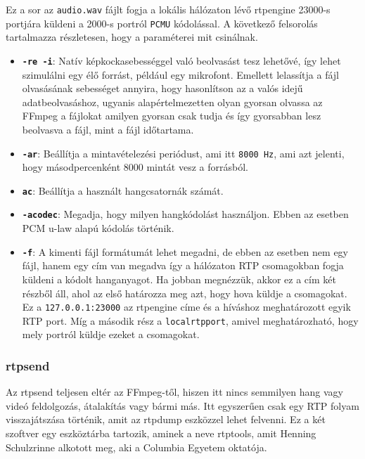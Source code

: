 Ez a sor az \texttt{audio.wav} fájlt fogja a lokális hálózaton lévő rtpengine 23000-s
portjára küldeni a 2000-s portról \texttt{PCMU} kódolással. A következő felsorolás 
tartalmazza részletesen, hogy a paraméterei mit csinálnak.

\begin{itemize}
	\item \textbf{\texttt{-re -i}}: Natív képkockasebességgel való beolvasást tesz 
	lehetővé, így lehet szimulálni egy élő forrást, például egy mikrofont. Emellett 
	lelassítja a fájl olvasásának sebességet annyira, hogy hasonlítson az a valós idejű 
	adatbeolvasáshoz, ugyanis alapértelmezetten olyan gyorsan olvassa az FFmpeg a 
	fájlokat amilyen gyorsan csak tudja és így gyorsabban lesz beolvasva a fájl, mint a 
	fájl időtartama. 
	\item \textbf{\texttt{-ar}}: Beállítja a mintavételezési periódust, ami itt 
	\texttt{8000 Hz}, ami azt jelenti, hogy másodpercenként 8000 mintát vesz a forrásból. 
	\item \textbf{\texttt{ac}}: Beállítja a használt hangcsatornák számát.
	\item \textbf{\texttt{-acodec}}: Megadja, hogy milyen hangkódolást használjon. Ebben 
	az esetben PCM u-law alapú kódolás történik.
	\item \textbf{\texttt{-f}}: A kimenti fájl formátumát lehet megadni, de ebben az 
	esetben nem egy fájl, hanem egy cím van megadva így a hálózaton RTP csomagokban fogja 
	küldeni a kódolt hanganyagot. Ha jobban megnézzük, akkor ez a cím két részből áll,
	ahol az első határozza meg azt, hogy hova küldje a csomagokat. Ez a 
	\texttt{127.0.0.1:23000} az rtpengine címe és a híváshoz meghatározott egyik RTP
	port. Míg a második rész a \texttt{localrtpport}, amivel meghatározható, hogy mely 
	portról küldje ezeket a csomagokat.
\end{itemize}

\subsubsection{rtpsend}

Az rtpsend \cite{rtpsend} teljesen eltér az FFmpeg-től, hiszen itt nincs semmilyen hang 
vagy videó feldolgozás, átalakítás vagy bármi más. Itt egyszerűen csak egy RTP folyam 
visszajátszása történik, amit az rtpdump eszközzel lehet felvenni. Ez a két 
szoftver egy eszköztárba tartozik, aminek a neve rtptools, amit Henning 
Schulzrinne alkotott meg, aki a Columbia Egyetem oktatója.

